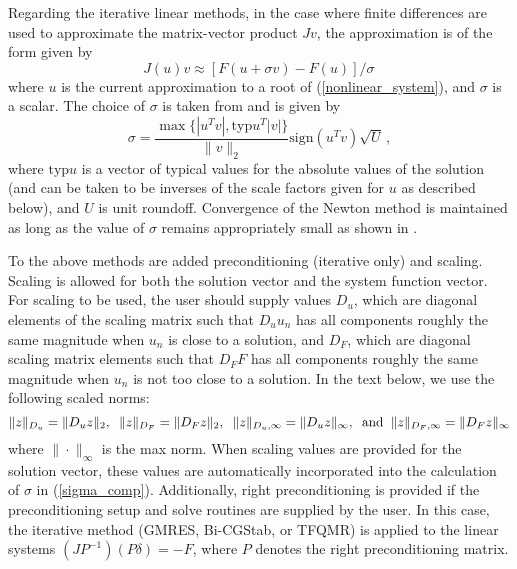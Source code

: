 Regarding the iterative linear methods, in the case where finite differences
are used to approximate the matrix-vector product $Jv$, the approximation is
of the form given by
\begin{equation}\label{jacobv}
J(u) v \approx [F(u+\sigma v) - F(u)]/\sigma \,
\end{equation}
where $u$ is the current approximation to a root of
(\ref{nonlinear_system}), and $\sigma$ is a scalar. The choice of
$\sigma$ is taken from \cite{BrSa:90} and is given by
\begin{equation}\label{sigma_comp}
  \sigma = \frac{\max \{|u^T v|, \mbox{typ}u^T |v|\}}{\|v\|_2}
  \mbox{sign}(u^T v) \sqrt{U} \, ,
\end{equation}
where $\mbox{typ}u$ is a vector of typical values for the absolute
values of the solution (and can be taken to be inverses of the
scale factors given for $u$ as described below), and $U$ is unit
roundoff. Convergence of the Newton method is maintained as long
as the value of $\sigma$ remains appropriately small as shown in
\cite{Bro:87}.

To the above methods are added preconditioning (iterative only)
and scaling. Scaling is allowed for both the solution vector and
the system function vector. For scaling to be used, the user should
supply values $D_u$, which are diagonal elements of the scaling matrix
such that $D_u u_n$ has all components roughly the same magnitude
when $u_n$ is close to a solution, and $D_F$, which are diagonal
scaling matrix elements such that $D_F F$ has all components
roughly the same magnitude when $u_n$ is not too close to a
solution. In the text below, we use the following scaled norms:
\begin{equation}
\|z\|_{D_u} = \|D_u z\|_2, \;\; \|z\|_{D_F} = \|D_F z\|_2, \;\;
\|z\|_{D_u,\infty} = \|D_u z\|_{\infty}, \;\; {\rm and} \;\;
\|z\|_{D_F,\infty} = \|D_F z\|_{\infty}
\end{equation}
where $\| \cdot \|_{\infty}$ is the max norm.  When scaling values
are provided for the solution vector, these values are
automatically incorporated into the calculation of $\sigma$ in
(\ref{sigma_comp}). Additionally, right preconditioning is
provided if the preconditioning setup and solve routines are
supplied by the user. In this case, the iterative method (GMRES, Bi-CGStab,
or TFQMR) is applied to the linear systems $(JP^{-1})(P\delta) = -F$, where
$P$ denotes the right preconditioning matrix.

